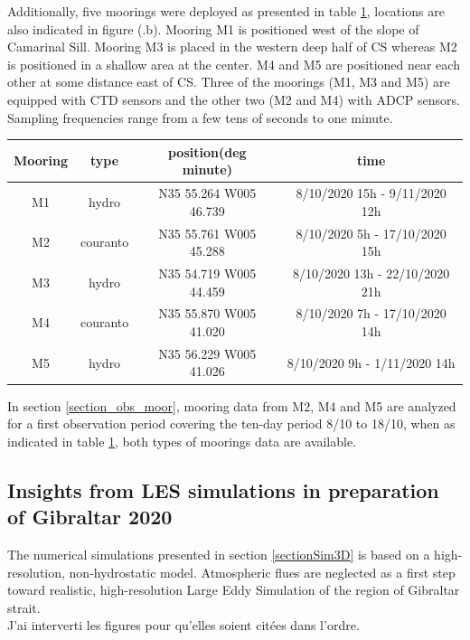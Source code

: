 Additionally, five moorings were deployed as presented in table \ref{tab_moor}, locations are also indicated in figure (.b). Mooring M1 is positioned west of the slope of Camarinal Sill. Mooring M3 is placed in the western deep half of CS whereas M2 is positioned in a shallow area at the center. M4 and M5 are positioned near each other at some distance east of CS. Three of the moorings (M1, M3 and M5) are equipped with CTD sensors and the other two (M2 and M4) with ADCP sensors. Sampling frequencies range from a few tens of seconds to one minute.

\begin{table}[!h]
        \centering
        \begin{tabular}{|c|c|c|c|}
                \hline
                Mooring & type & position(deg minute) & time \\ 
                 \hline
                M1 & hydro & N35 55.264 W005 46.739 & 8/10/2020 15h - 9/11/2020 12h\\
                M2 & couranto & N35 55.761 W005 45.288 & 8/10/2020 5h - 17/10/2020 15h\\
                M3 & hydro & N35 54.719 W005 44.459 & 8/10/2020 13h - 22/10/2020 21h\\
                M4 & couranto & N35 55.870 W005 41.020 & 8/10/2020 7h - 17/10/2020 14h\\
                M5 & hydro & N35 56.229 W005 41.026 & 8/10/2020 9h - 1/11/2020 14h\\
                \hline
        \end{tabular}
        \label{tab_moor}
\end{table}
In section \ref{section_obs_moor}, mooring data from M2, M4 and M5 are analyzed for a first observation period covering the ten-day period 8/10 to 18/10, when as indicated in table \ref{tab_moor}, both types of moorings data are available.


\subsection{Insights from \color{blue}LES \color{black} simulations in preparation of Gibraltar 2020}

\color{blue}The numerical simulations presented in section \ref{sectionSim3D} is based on a high-resolution, non-hydrostatic model. Atmospheric flues are neglected as a first step toward realistic, high-resolution Large Eddy Simulation of the region of Gibraltar strait.\color{black}\\ 
 \color{green} J'ai interverti les figures pour qu'elles soient citées dans l'ordre.\color{black}
 
